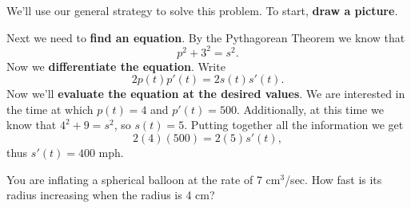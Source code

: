 \begin{solution}
We'll use our general strategy to solve this problem. To start,
\textbf{draw a picture}.


Next we need to \textbf{find an equation}. By the Pythagorean Theorem
we know that
\[
p^2+3^2=s^2.
\] 
Now we \textbf{differentiate the equation}. Write
\[
2p(t)p'(t)  = 2s(t) s'(t).
\] 
Now we'll \textbf{evaluate the equation at the desired values}.  We
are interested in the time at which $p(t)=4$ and $p'(t) =
500$. Additionally, at this time we know that $4^2+9=s^2$, so
$s(t)=5$.  Putting together all the information we get
\[
2(4)(500)=2(5)s'(t),
\]
thus $s'(t)=400$ mph.
\end{solution}





\begin{example}
You are inflating a spherical balloon at the rate of 7 cm${}^3$/sec.  How
fast is its radius increasing when the radius is 4 cm?
\end{example}


